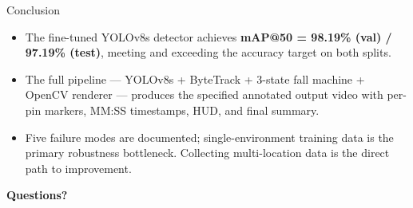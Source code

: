 \documentclass[aspectratio=169,10pt]{beamer}
\begin{document}
\begin{frame}{Conclusion}
  \begin{itemize}
    \item The fine-tuned YOLOv8s detector achieves \textbf{mAP@50 = 98.19\% (val) / 97.19\% (test)}, meeting and exceeding the accuracy target on both splits.

    \item The full pipeline --- YOLOv8s + ByteTrack + 3-state fall machine + OpenCV renderer --- produces the specified annotated output video with per-pin markers, MM:SS timestamps, HUD, and final summary.

    \item Five failure modes are documented; single-environment training data is the primary robustness bottleneck. Collecting multi-location data is the direct path to improvement.
  \end{itemize}

  \vspace{1.5em}
  \begin{center}
    \Large\textbf{Questions?}
  \end{center}
\end{frame}
\end{document}
